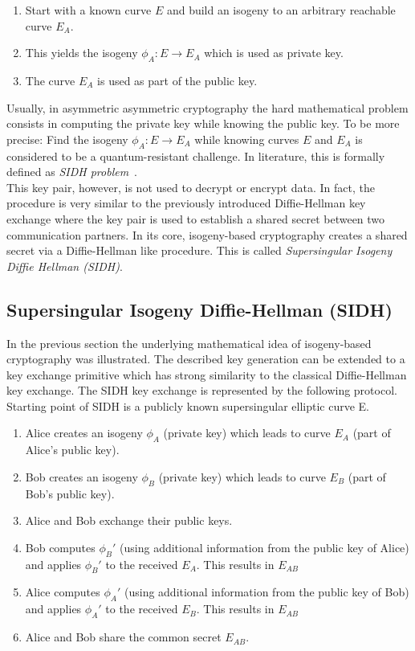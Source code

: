 \begin{enumerate}
\item Start with a known curve $E$ and build an isogeny to an arbitrary reachable curve $E_A$.
\item This yields the isogeny $\phi_A: E \to E_A$ which is used as private key.
\item The curve $E_A$ is used as part of the public key.
\end{enumerate}
Usually, in asymmetric asymmetric cryptography the hard mathematical problem consists in computing the private key while knowing the public key. To be more precise: Find the isogeny $\phi_A: E \to E_A$ while knowing curves $E$ and $E_A$ is considered to be a quantum-resistant challenge. In literature, this is formally defined as \textit{\gls{SIDH} problem}~\parencite{sike2020spec}. 
\\
This key pair, however, is not used to decrypt or encrypt data. In fact, the procedure is very similar to the previously introduced Diffie-Hellman key exchange where the key pair is used to establish a shared secret between two communication partners.
In its core, isogeny-based cryptography creates a shared secret via a Diffie-Hellman like procedure. This is called \textit{Supersingular Isogeny Diffie Hellman (\gls{SIDH})}.

\subsection{Supersingular Isogeny Diffie-Hellman (\gls{SIDH})}

In the previous section the underlying mathematical idea of isogeny-based cryptography was illustrated. The described key generation can be extended to a key exchange primitive which has strong similarity to the classical Diffie-Hellman key exchange. The SIDH key exchange is represented by the following protocol.\\
Starting point of \gls{SIDH} is a publicly known supersingular elliptic curve E. 

\begin{enumerate}
\item Alice creates an isogeny $\phi_A$ (private key) which leads to curve $E_A$ (part of Alice's public key).
\item Bob creates an isogeny $\phi_B$ (private key) which leads to curve $E_B$ (part of Bob's public key).
\item Alice and Bob exchange their public keys.
\item Bob computes $\phi_B'$ (using additional information from the public key of Alice) and applies $\phi_B'$ to the received $E_A$. This results in $E_{AB}$
\item Alice computes $\phi_A'$ (using additional information from the public key of Bob) and applies $\phi_A'$ to the received $E_B$. This results in $E_{AB}$
\item Alice and Bob share the  common secret $E_{AB}$.
\end{enumerate}



